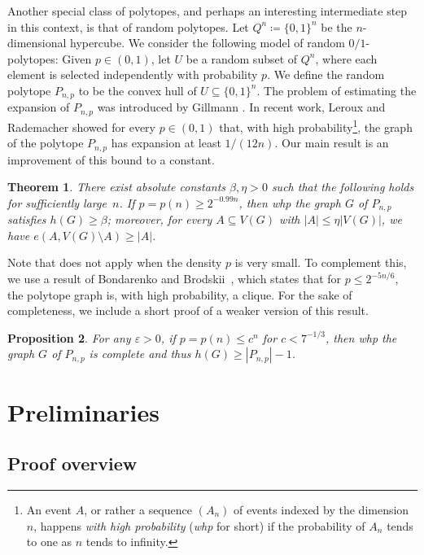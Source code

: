\documentclass[11pt,a4paper,oneside,reqno]{amsart}
\newtheorem{theorem}{Theorem}[section]
\newtheorem{proposition}[theorem]{Proposition}
\begin{document}
Another special class of polytopes, and perhaps an interesting intermediate step in this context, is that of random polytopes.  Let $Q^n \coloneqq \{0,1\}^n$ be the $n$-dimensional hypercube.  We consider the following model of random $0/1$-polytopes: Given $p \in (0,1)$, let $U$ be a random subset of $Q^n$, where each element is selected independently with probability $p$. We define the random polytope $P_{n,p}$ to be the convex hull of $U\subseteq \{0,1\}^n$.  The problem of estimating the expansion of $P_{n,p}$ was introduced by Gillmann \cite{gillmannthesis07}. In recent work, Leroux and Rademacher \cite{randomexppolytopes24} showed for every $p\in (0,1)$ that, with high probability\footnote{An event $A$, or rather a sequence $(A_n)$ of events indexed by the dimension $n$, happens \emph{with high probability} (\emph{whp} for short) if the probability of $A_n$ tends to one as $n$ tends to infinity.}, the graph of the polytope $P_{n,p}$ has expansion at least $1/(12n)$. Our main result is an improvement of this bound to a constant.

\begin{theorem}\label{thm:main}
  There exist absolute constants $\beta, \eta>0$ such that the following holds for sufficiently large~$n$.  If $p = p(n)\geq 2^{-0.99n}$, then whp the graph $G$ of $P_{n,p}$ satisfies $h(G)\geq \beta$;  moreover, for every $A \subseteq V(G)$ with $|A|\leq \eta |V(G)|$, we have $e(A, V(G) \setminus A)\geq |A|$.
\end{theorem}

Note that  does not apply when the density \( p \) is very small. To complement this, we use a result of Bondarenko and Brodskii~\cite{BondarenkoBrodskiiCliques}, which states that for \( p \leq 2^{-5n/6} \), the polytope graph is, with high probability, a clique. For the sake of completeness, we include a short proof of a weaker version of this result.

\begin{proposition}\label{prop:sparse}
  For any $\varepsilon >0$, if $p = p(n)\leq c^{n}$ for $c<7^{-1/3}$, then whp the graph $G$ of $P_{n,p}$ is complete and thus $h(G) \ge |P_{n,p}| - 1$.
\end{proposition}

\section{Preliminaries}\label{sec:preliminaries}

\subsection{Proof overview}\label{subsec:outline}
\end{document}
